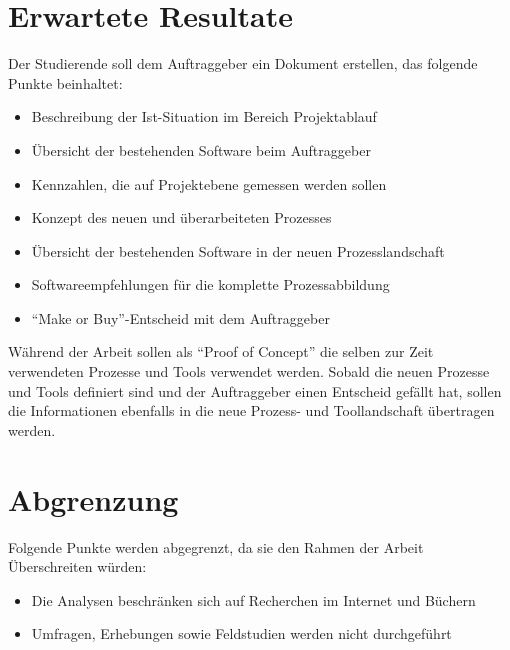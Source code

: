 \section{Erwartete Resultate}
Der Studierende soll dem Auftraggeber ein Dokument erstellen, das folgende 
Punkte beinhaltet: 

\begin{itemize}
    \item Beschreibung der Ist-Situation im Bereich Projektablauf
    \item Übersicht der bestehenden Software beim Auftraggeber
    \item Kennzahlen, die auf Projektebene gemessen werden sollen
    \item Konzept des neuen und überarbeiteten Prozesses
    \item Übersicht der bestehenden Software in der neuen Prozesslandschaft
    \item Softwareempfehlungen für die komplette Prozessabbildung
    \item ``Make or Buy''-Entscheid mit dem Auftraggeber
\end{itemize}

Während der Arbeit sollen als ``Proof of Concept'' die selben zur Zeit verwendeten
Prozesse und Tools verwendet werden. Sobald die neuen Prozesse und Tools
definiert sind und der Auftraggeber einen Entscheid gefällt hat, sollen die
Informationen ebenfalls in die neue Prozess- und Toollandschaft übertragen werden.

\section{Abgrenzung}
Folgende Punkte werden abgegrenzt, da sie den Rahmen der Arbeit Überschreiten 
würden:

\begin{itemize}
    \item Die Analysen beschränken sich auf Recherchen im Internet und Büchern
    \item Umfragen, Erhebungen sowie Feldstudien werden nicht durchgeführt
\end{itemize}

